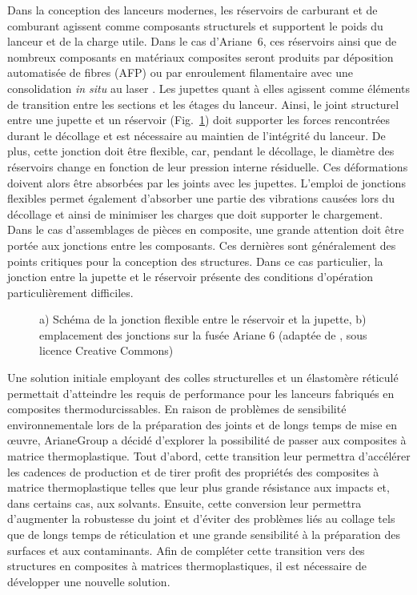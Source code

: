 Dans la conception des lanceurs modernes, les réservoirs de carburant et de comburant agissent comme composants structurels et supportent le poids du lanceur et de la charge utile. 
Dans le cas \mbox{d'Ariane 6}, ces réservoirs ainsi que de nombreux composants en matériaux composites seront produits par déposition automatisée de fibres (AFP) ou par enroulement filamentaire avec une consolidation \textit{in situ} au laser \cite{Krzeminski2014}. 
Les jupettes quant à elles agissent comme éléments de transition entre les sections et les étages du lanceur. 
Ainsi, le joint structurel entre une jupette et un réservoir (Fig.~\ref{fig:schema_jonction}) doit supporter les forces rencontrées durant le décollage et est nécessaire au maintien de l'intégrité du lanceur. 
De plus, cette jonction doit être flexible, car, pendant le décollage, le diamètre des réservoirs change en fonction de leur pression interne résiduelle. 
Ces déformations doivent alors être absorbées par les joints avec les jupettes. 
L'emploi de jonctions flexibles permet également d'absorber une partie des vibrations causées lors du décollage et ainsi de minimiser les charges que doit supporter le chargement. 
Dans le cas d'assemblages de pièces en composite, une grande attention doit être portée aux jonctions entre les composants. 
Ces dernières sont généralement des points critiques pour la conception des structures. 
Dans ce cas particulier, la jonction entre la jupette et le réservoir présente des conditions d'opération particulièrement difficiles. 

\begin{figure}[h!]
	\centering
	\subfigure[]
	{\label{fig:schema_jonction_a} 								
		
	} \qquad
	\caption{a) Schéma de la jonction flexible entre le réservoir et la jupette, b) emplacement des jonctions sur la fusée Ariane 6 (adaptée de \cite{Wikipedia:Ariane6}, sous licence Creative Commons)}
	\label{fig:schema_jonction}
\end{figure}

Une solution initiale employant des colles structurelles et un élastomère réticulé permettait d'atteindre les requis de performance pour les lanceurs fabriqués en composites thermodurcissables. 
En raison de problèmes de sensibilité environnementale lors de la préparation des joints et de longs temps de mise en œuvre, ArianeGroup a décidé d'explorer la possibilité de passer aux composites à matrice thermoplastique. 
Tout d'abord, cette transition leur permettra d'accélérer les cadences de production et de tirer profit des propriétés des composites à matrice thermoplastique telles que leur plus grande résistance aux impacts et, dans certains cas, aux solvants. 
Ensuite, cette conversion leur permettra d'augmenter la robustesse du joint et d'éviter des problèmes liés au collage tels que de longs temps de réticulation et une grande sensibilité à la préparation des surfaces et aux contaminants. 
Afin de compléter cette transition vers des structures en composites à matrices thermoplastiques, il est nécessaire de développer une nouvelle solution. 

